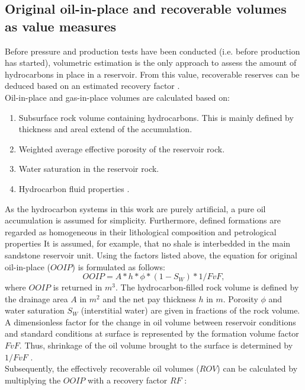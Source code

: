         \subsection{Original oil-in-place and recoverable volumes as value measures}
        Before pressure and production tests have been conducted (i.e. before production has started), volumetric estimation is the only approach to assess the amount of hydrocarbons in place in a reservoir. From this value, recoverable reserves can be deduced based on an estimated recovery factor \citep{dean2007volumetric}.\\
        Oil-in-place and gas-in-place volumes are calculated based on:
        \begin{enumerate}
        \item Subsurface rock volume containing hydrocarbons. This is mainly defined by thickness and areal extend of the accumulation.
        \item Weighted average effective porosity of the reservoir rock.
        \item Water saturation in the reservoir rock.
        \item Hydrocarbon fluid properties \citep{dean2007volumetric}.
        \end{enumerate}
        As the hydrocarbon systems in this work are purely artificial, a pure oil accumulation is assumed for simplicity. Furthermore, defined formations are regarded as homogeneous in their lithological composition and petrological properties It is assumed, for example, that no shale is interbedded in the main sandstone reservoir unit. Using the factors listed above, the equation for original oil-in-place ($OOIP$) is formulated as follows:
        \begin{equation}\label{eq:OOIP}
        OOIP = A * h * \phi * (1 - S_W) * 1/FvF,
        \end{equation}
        where $OOIP$ is returned in $m^3$. The hydrocarbon-filled rock volume is defined by the drainage area $A$ in $m^2$ and the net pay thickness $h$ in $m$. Porosity $\phi$ and water saturation $S_W$ (interstitial water) are given in fractions of the rock volume. A dimensionless factor for the change in oil volume between reservoir conditions and standard conditions at surface is represented by the formation volume factor $FvF$. Thus, shrinkage of the oil volume brought to the surface is determined by $1/FvF$ \citep{dean2007volumetric}.\\
        Subsequently, the effectively recoverable oil volumes ($ROV$) can be calculated by multiplying the $OOIP$ with a recovery factor $RF$ \citep{dean2007volumetric}:
